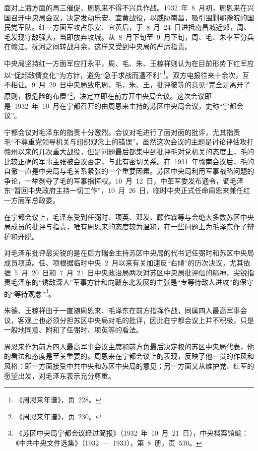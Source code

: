 面对上海方面的再三催促，周恩来不得不兴兵作战。1932~年~8~月初，周恩来在兴国召开中央局会议，决定发动乐安、宜黄战役，以威胁南昌，吸引围剿鄂豫皖的国民党军队。红一方面军攻占乐安、宜黄后，于~8~月~24~日进抵南昌城近郊，周、毛发现守敌强大，当即放弃攻城。从~8~月下旬至~9~月下旬，周、毛、朱率军分兵在赣江、抚河之间转战月余，这样又受到中央局的严厉指责。

中央局坚持红一方面军应打永平，周、毛、朱、王稼祥则认为在目前形势下红军应以“促起敌情变化”为方针，避免“急于求战而遭不利”\footnote{《周恩来年谱》，页~228。}。双方电报往来十余次，互不相让。9~月~29~日中央局致电周、毛、朱、王，批评彼等的意见“完全是离开了原则，极危险的布置”\footnote{《周恩来年谱》，页~230。}，决定立即在前方开中央局会议。这次会议即是~1932~年~10~月在宁都召开的由周恩来主持的苏区中央局会议，史称“宁都会议”。

宁都会议对毛泽东的指责十分激烈。会议对毛进行了面对面的批评，尤其指责毛“不尊重党领导机关与组织观念上的错误”。虽然这次会议的主题是讨论评估攻打赣州以来的几次重大战役，但是问题最后都集中到批评毛对党机关的态度上，毛的比较正确的军事主张被会议否定，与此有密切关系。在~1931~年赣南会议后，毛的自傲一直是中央局与毛关系紧张的一个重要因素。苏区中央局利用军事战略问题的争论，一举剥夺了毛的军事指挥权。10~月~12~日，中革军委发布通令，调毛泽东“暂回中央政府主持一切工作”，10~月~26~日，临时中央正式任命周恩来兼任红一方面军总政委。

在宁都会议上，毛泽东受到任弼时、项英、邓发、顾作霖等与会绝大多数苏区中央局成员的批评与指责，唯有周恩来的态度较为温和，在一些问题上为毛泽东作了辩护和开脱。

对毛泽东批评最尖锐的是在后方瑞金主持苏区中央局的代书记任弼时和苏区中央局成员项英。任、项根据临时中央~2~月以来有关加速反“右倾”的历次决议，尤其依据~5~月~20~日和~7~月~21~日中央政治局两次对苏区中央局批评信的精神，尖锐指责毛泽东的“诱敌深人”军事方针和向赣东北发展的主张是“专等待敌人进攻”的保守的“等待观念”\footnote{《苏区中央局宁都会议经过简报》（1932~年~10~月~21~日），中央档案馆编：《中共中央文件选集》（1932~—~1933），第~8~册，页~530。}。

朱德、王稼祥由于一直随周恩来、毛泽东在前方指挥作战，同属四人最高军事会议，客观上也必须分担苏区中央局对毛的批评，因此在宁都会议上并不积极，只是一般地同意、附和了任弼时、项英等的看法。

周恩来作为前方四人最高军事会议主席和前方负最后决定权的苏区中央局代表，他的看法和态度是至关重要的。周恩来在宁都会议上的表现，反映了他一贯的作风和风格：即一方面接受中共中央和苏区中央局的意见；另一方面又从维护党、红军的愿望出发，对毛泽东表示充分尊重。

